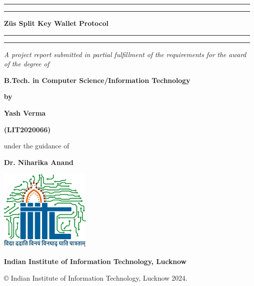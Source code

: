 \thispagestyle{empty}

\setcounter{page}{1}

\def\thepage{\roman{page}}

\begin{center}

    \rule[0.5ex]{\linewidth}{2pt}\vspace*{-\baselineskip}\vspace*{3.2pt}
    \rule[0.5ex]{\linewidth}{2pt}
    
    \vspace*{3.2pt}

    {\Large\bf Züs Split Key Wallet Protocol}

    \vspace*{3.2pt}
    
    \rule[0.5ex]{\linewidth}{2pt}\vspace*{-\baselineskip}\vspace*{3.2pt}
    \rule[0.5ex]{\linewidth}{2pt}
    
    \vspace{1.5cm}
    
    \textit{{A project report submitted in partial fulfillment of the requirements 
    for the award of the degree of}}
    
    \vspace{1cm}
    
    {\bf B.Tech. in Computer Science/Information Technology}
    
    \vspace{1cm}
    
    {\bf by}
    
    \vspace{0.8cm}
    
    {\bf {Yash Verma}}
    
    \vspace{0.1cm}
    
    {\bf {(LIT2020066)}}
    
    \vspace{1.8cm}
    
    {under the guidance of}
    
    \vspace{0.1cm}

        {\bf{Dr. Niharika Anand}}

    
    \vspace{1.8cm}
    
    \includegraphics[height=4cm]{./Images/Logo_IIITL.png}
    
    \vspace{.5cm}
    {\bf\large{Indian Institute of Information Technology, Lucknow}}\\
    {\bf{}}
\end{center}

\medskip

\centerline{ \copyright{} Indian Institute of Information Technology, Lucknow 2024.}

\cleardoublepage





